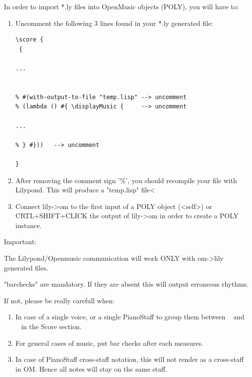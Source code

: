 \documentclass{article}
\begin{document}
In order to import *.ly files into OpenMusic objects (POLY), you will have to:\\
\begin{enumerate}
\item Uncomment the following 3 lines found in your *.ly generated file:\\

\begin{tcolorbox}
  
\begin{verbatim}
\score { 
 { 

...


% #(with-output-to-file "temp.lisp" --> uncomment
% (lambda () #{ \displayMusic {     --> uncomment

...

% } #}))   --> uncomment

} 
\end{verbatim}    

\end{tcolorbox}  
\vskip 5pt

\item After removing the comment sign '\%', you should recompile your file with Lilypond. This will produce a "temp.lisp" file<\\

\item Connect lily->om to the first input of a POLY object (<self>) or CRTL+SHIFT+CLICK the output of lily->om in order to create a POLY instance.\\

\end{enumerate}

Important:

The Lilypond/Openmusic communication will work ONLY with om->lily generated files. 

"barchecks" are mandatory. If they are absent this will output erroneous rhythms.

If not, please be really carefull when:\\

\begin{enumerate}
\item In case of a single voice, or a single PianoStaff to group them between \guillemotleft~ and \guillemotright~ in the Score section.\\

\item For general cases of music, put bar checks after each measures.\\

\item In case of PianoStaff cross-staff notation, this will not render as a cross-staff in OM. Hence all notes will stay on the same staff.
\end{enumerate}  
\end{document}
